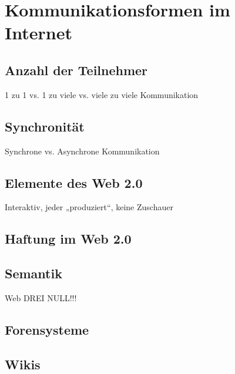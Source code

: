 \label{sec:grundlagen}

\section{Kommunikationsformen im Internet} %
\label{sec:kommunikationsformen_im_internet}

\subsection{Anzahl der Teilnehmer} %
\label{sub:anzahl_der_teilnehmer}
1 zu 1 vs. 1 zu viele vs. viele zu viele Kommunikation

\subsection{Synchronität} %
\label{sub:synchronitat}
Synchrone vs. Asynchrone Kommunikation

\subsection{Elemente des Web 2.0} %
\label{sub:elemente_des_web_2_0}
Interaktiv, jeder „produziert“, keine Zuschauer

\subsection{Haftung im Web 2.0} %
\label{sub:haftung_im_web_2_0}


\subsection{Semantik} %
\label{sub:semantik}
Web DREI NULL!!!

\subsection{Forensysteme} %
\label{sub:forensysteme}


\subsection{Wikis} %
\label{sub:wikis}


